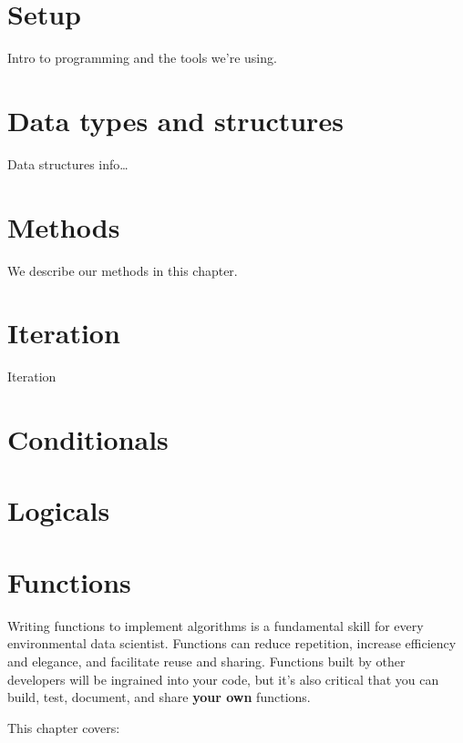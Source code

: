 \documentclass[
]{book}
\begin{document}
\hypertarget{setup}{%
\chapter{Setup}\label{setup}}

Intro to programming and the tools we're using.

\hypertarget{types}{%
\chapter{Data types and structures}\label{types}}

Data structures info\ldots{}

\hypertarget{methods}{%
\chapter{Methods}\label{methods}}

We describe our methods in this chapter.

\hypertarget{iteration}{%
\chapter{Iteration}\label{iteration}}

Iteration

\hypertarget{conditionals}{%
\chapter{Conditionals}\label{conditionals}}

\hypertarget{logicals}{%
\chapter{Logicals}\label{logicals}}

\hypertarget{functions}{%
\chapter{Functions}\label{functions}}

Writing functions to implement algorithms is a fundamental skill for every environmental data scientist. Functions can reduce repetition, increase efficiency and elegance, and facilitate reuse and sharing. Functions built by other developers will be ingrained into your code, but it's also critical that you can build, test, document, and share \textbf{your own} functions.

This chapter covers:
\end{document}

